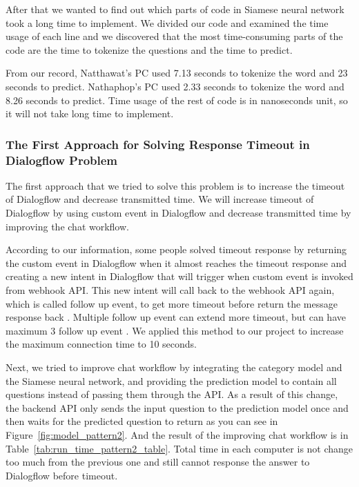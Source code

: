 \documentclass[12pt,oneside,openright,a4paper]{cpe-english-project}
\begin{document}
After that we wanted to find out which parts of code in Siamese neural network took a long
time to implement. We divided our code and examined the time usage of each line and we
discovered that the most time-consuming parts of the code are the time to tokenize the
questions and the time to predict.

From our record, Natthawat's PC used 7.13 seconds to tokenize the word and 23 seconds to predict.
Nathaphop's PC used 2.33 seconds to tokenize the word and 8.26 seconds to predict.
Time usage of the rest of code is in nanoseconds unit, so it will not take long time to implement.

\subsubsection{The First Approach for Solving Response Timeout in Dialogflow Problem}
The first approach that we tried to solve this problem is to increase the timeout of Dialogflow
and decrease transmitted time. We will increase timeout of Dialogflow by using
custom event in Dialogflow and decrease transmitted time by improving the chat workflow.

According to our information, some people solved timeout response
by returning the custom event in Dialogflow when it almost reaches the timeout response and
creating a new intent in Dialogflow that will trigger when custom event is invoked from webhook API.
This new intent will call back to the webhook API again, which is called follow up event, to get more timeout
before return the message response back \cite{extend_webhook_intent}.
Multiple follow up event can extend more timeout, but can have maximum 3 follow up event \cite{changing_intent_webhook}.
We applied this method to our project to increase the maximum connection time to 10 seconds.

Next, we tried to improve chat workflow by integrating the category model and the Siamese neural network, and
providing the prediction model to contain all questions instead of passing them through the API. As a result
of this change, the backend API only sends the input question to the prediction model once and then waits for
the predicted question to return as you can see in Figure~\ref*{fig:model_pattern2}. And the result of the
improving chat workflow is in Table~\ref*{tab:run_time_pattern2_table}.
Total time in each computer is not change too much from the previous one and
still cannot response the answer to Dialogflow before timeout.
\end{document}
